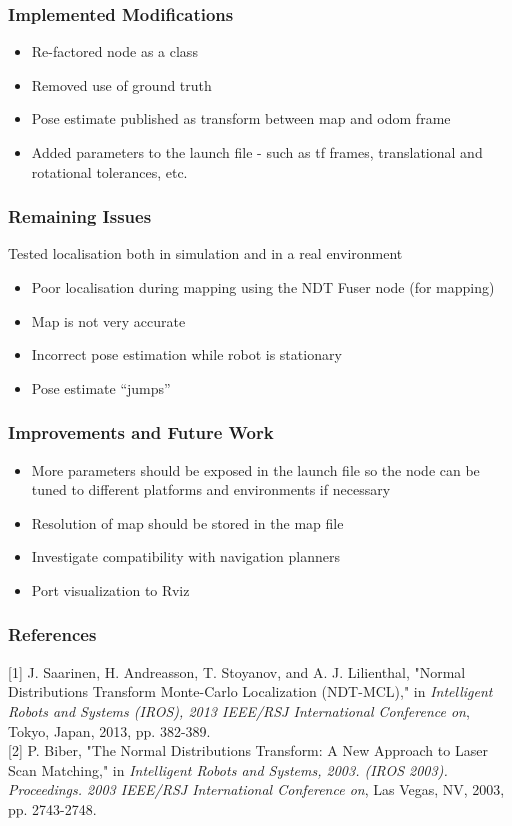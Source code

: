 \documentclass{beamer}
\begin{document}
\begin{frame}
\frametitle{Implemented Modifications}
\begin{itemize}
\item Re-factored node as a class
\item Removed use of ground truth
\item Pose estimate published as transform between map and odom frame
\item Added parameters to the launch file - such as tf frames, translational and rotational tolerances, etc.
\end{itemize}
\end{frame}

\begin{frame}
\frametitle{Remaining Issues}
Tested localisation both in simulation and in a real environment
\begin{itemize}
\item Poor localisation during mapping using the NDT Fuser node (for mapping)
\item Map is not very accurate
\item Incorrect pose estimation while robot is stationary
\item Pose estimate ``jumps''
\end{itemize}
\end{frame}

\begin{frame}
\frametitle{Improvements and Future Work}
\begin{itemize}
\item More parameters should be exposed in the launch file so the node can be tuned to different platforms and environments if necessary
\item Resolution of map should be stored in the map file
\item Investigate compatibility with navigation planners
\item Port visualization to Rviz
\end{itemize}
\end{frame}

\begin{frame}
\frametitle{References}

	[1] J. Saarinen, H. Andreasson, T. Stoyanov, and A. J. Lilienthal, "Normal Distributions Transform Monte-Carlo Localization (NDT-MCL)," in {\it Intelligent Robots and Systems (IROS), 2013 IEEE/RSJ International Conference on}, Tokyo, Japan, 2013, pp. 382-389.\\

	[2] P. Biber, "The Normal Distributions Transform: A New Approach to Laser Scan Matching," in {\it Intelligent Robots and Systems, 2003. (IROS 2003). Proceedings. 2003 IEEE/RSJ International Conference on}, Las Vegas, NV, 2003, pp. 2743-2748.
\end{frame}
\end{document}
